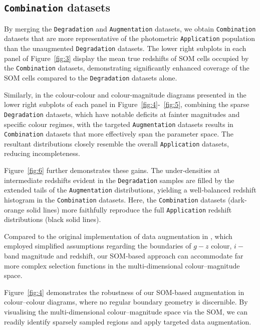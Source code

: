 \subsection{\texttt{Combination} datasets}

By merging the \texttt{Degradation} and \texttt{Augmentation} datasets, we obtain \texttt{Combination} datasets that are more representative of the photometric \texttt{Application} population than the unaugmented \texttt{Degradation} datasets. The lower right subplots in each panel of Figure~\ref{fig:3} display the mean true redshifts of SOM cells occupied by the \texttt{Combination} datasets, demonstrating significantly enhanced coverage of the SOM cells compared to the \texttt{Degradation} datasets alone.

Similarly, in the colour-colour and colour-magnitude diagrams presented in the lower right subplots of each panel in Figure~\ref{fig:4}-~\ref{fig:5}, combining the sparse \texttt{Degradation} datasets, which have notable deficits at fainter magnitudes and specific colour regimes, with the targeted \texttt{Augmentation} datasets results in \texttt{Combination} datasets that more effectively span the parameter space. The resultant distributions closely resemble the overall \texttt{Application} datasets, reducing incompleteness. 

Figure~\ref{fig:6} further demonstrates these gains. The under‐densities at intermediate redshifts evident in the \texttt{Degradation} samples are filled by the extended tails of the \texttt{Augmentation} distributions, yielding a well‐balanced redshift histogram in the \texttt{Combination} datasets. Here, the \texttt{Combination} datasets (dark-orange solid lines) more faithfully reproduce the full \texttt{Application} redshift distributions (black solid lines).

Compared to the original implementation of data augmentation in \citet{2024ApJ...967L...6M}, which employed simplified assumptions regarding the boundaries of \(g - z\) colour, \(i-\)band magnitude and redshift, our SOM-based approach can accommodate far more complex selection functions in the multi-dimensional colour–magnitude space. 

Figure~\ref{fig:4} demonstrates the robustness of our SOM-based augmentation in colour–colour diagrams, where no regular boundary geometry is discernible. By visualising the multi-dimensional colour–magnitude space via the SOM, we can readily identify sparsely sampled regions and apply targeted data augmentation.

